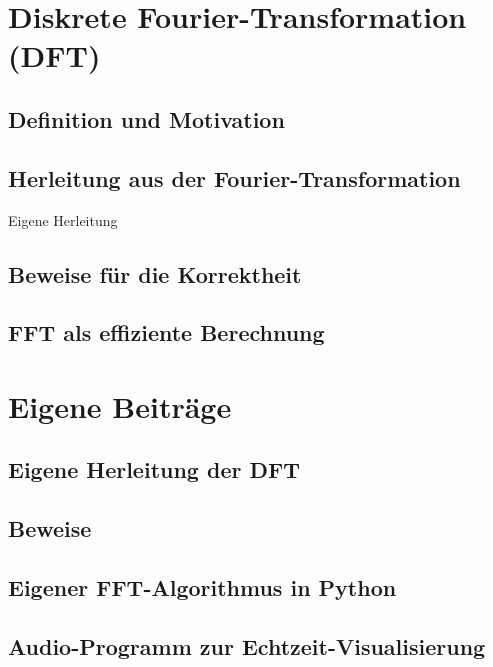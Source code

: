 \documentclass[a4paper,12pt]{article}
\theoremstyle{definition}
\theoremstyle{remark}
\begin{document}
\section{Diskrete Fourier-Transformation (DFT)}
\subsection{Definition und Motivation}
\subsection{Herleitung aus der Fourier-Transformation}
Eigene Herleitung
\subsection{Beweise für die Korrektheit}
\subsection{FFT als effiziente Berechnung}

\section{Eigene Beiträge}
\subsection{Eigene Herleitung der DFT}
\subsection{Beweise}
\subsection{Eigener FFT-Algorithmus in Python}
\subsection{Audio-Programm zur Echtzeit-Visualisierung}
\end{document}
